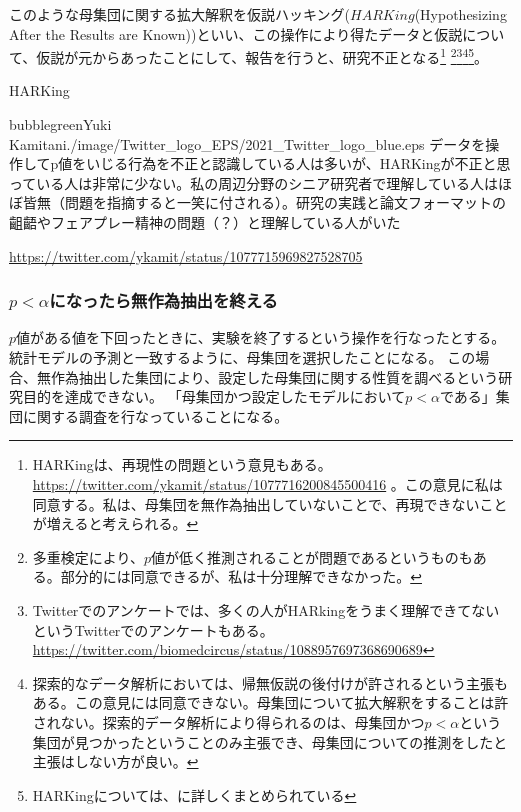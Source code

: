 このような母集団に関する拡大解釈を仮説ハッキング($HARKing$(Hypothesizing After the Results are Known))といい、この操作により得たデータと仮説について、仮説が元からあったことにして、報告を行うと、研究不正となる\footnote{
    HARKingは、再現性の問題という意見もある。
    \url{https://twitter.com/ykamit/status/1077716200845500416} 。この意見に私は同意する。私は、母集団を無作為抽出していないことで、再現できないことが増えると考えられる。
}
\footnote{
    多重検定により、$p$値が低く推測されることが問題であるというものもある\cite{池田_功毅2016,中村_大輝2021sp20016}。部分的には同意できるが、私は十分理解できなかった。
}\footnote{
    Twitterでのアンケートでは、多くの人がHARkingをうまく理解できてないというTwitterでのアンケートもある。
    \url{https://twitter.com/biomedcircus/status/1088957697368690689}
}\footnote{
    探索的なデータ解析においては、帰無仮説の後付けが許されるという主張もある。この意見には同意できない。母集団について拡大解釈をすることは許されない。探索的データ解析により得られるのは、母集団かつ$p<\alpha$という集団が見つかったということのみ主張でき、母集団についての推測をしたと主張はしない方が良い。
}\footnote{
    HARKingについては、\cite{kerr1998harking}に詳しくまとめられている
}。



\begin{SMbox}{HARKing}
    \begin{rightbubbles}{bubblegreen}{Yuki Kamitani}{./image/Twitter_logo_EPS/2021_Twitter_logo_blue.eps}
    データを操作してp値をいじる行為を不正と認識している人は多いが、HARKingが不正と思っている人は非常に少ない。私の周辺分野のシニア研究者で理解している人はほぼ皆無（問題を指摘すると一笑に付される）。研究の実践と論文フォーマットの齟齬やフェアプレー精神の問題（？）と理解している人がいた
        \begin{flushright} 
            \small	\url{https://twitter.com/ykamit/status/1077715969827528705}
        \end{flushright}    
    \end{rightbubbles}
  \end{SMbox}
  

\subsubsection{$p<\alpha$になったら無作為抽出を終える}
$p$値がある値を下回ったときに、実験を終了するという操作を行なったとする。
統計モデルの予測と一致するように、母集団を選択したことになる。
この場合、無作為抽出した集団により、設定した母集団に関する性質を調べるという研究目的を達成できない。
「母集団かつ設定したモデルにおいて$p<\alpha$である」集団に関する調査を行なっていることになる。

